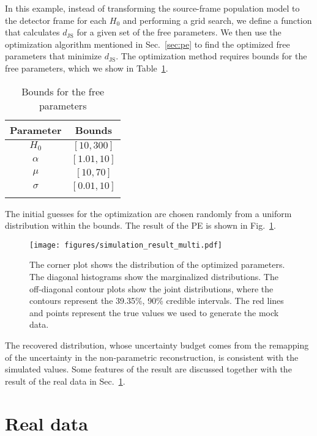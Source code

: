 \documentclass[sn-aps, pdflatex]{sn-jnl}
\begin{document}
In this example, instead of transforming the source-frame population model to the detector frame for each $H_0$ and performing a grid search, we define a function that calculates $d_\mathrm{JS}$ for a given set of the free parameters.
We then use the optimization algorithm mentioned in Sec.~\ref{sec:pe} to find the optimized free parameters that minimize $d_\mathrm{JS}$.
The optimization method requires bounds for the free parameters, which we show in Table~\ref{tab:bounds}.
\begin{table}[htbp]
    \caption{Bounds for the free parameters}
    \begin{tabular}{cc}
        \toprule
        Parameter & Bounds \\
        \midrule
        $H_0$ & $[10, 300]$ \\
        $\alpha$ & $[1.01, 10]$ \\
        $\mu$ & $[10, 70]$ \\
        $\sigma$ & $[0.01, 10]$ \\
        \botrule
    \end{tabular}
    \label{tab:bounds}
\end{table}
The initial guesses for the optimization are chosen randomly from a uniform distribution within the bounds.
The result of the \ac{PE} is shown in Fig.~\ref{fig:simulation_result_multi}.
\begin{figure}[htbp]
    \texttt{[image: figures/simulation\_result\_multi.pdf]}
    \caption{
        The corner plot shows the distribution of the optimized parameters.
        The diagonal histograms show the marginalized distributions.
        The off-diagonal contour plots show the joint distributions, where the contours represent the 39.35\%, 90\% credible intervals.
        The red lines and points represent the true values we used to generate the mock data.
    }
    \label{fig:simulation_result_multi}
\end{figure}
The recovered distribution, whose uncertainty budget comes from the remapping of the uncertainty in the non-parametric reconstruction, is consistent with the simulated values.
Some features of the result are discussed together with the result of the real data in Sec.~\ref{sec:real_data}.

\section{Real data}
\label{sec:real_data}
\end{document}
